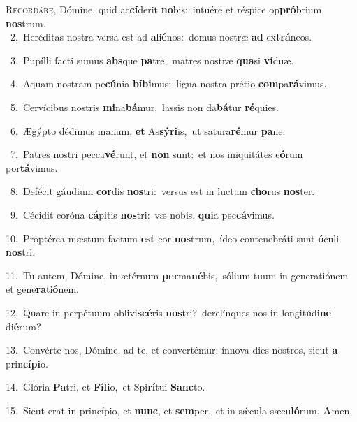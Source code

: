 \lettrine{\initial\textcolor{\initialcolor}{R}}{ecordáre,} Dómine, quid ac\-\textbf{cí}\-derit \textbf{no}\-bis:~\star intuére et réspice op\-\textbf{pró}\-brium \textbf{nos}\-trum.\\
{\numbfont\textcolor{\numbcolor}{~2.}}~Heréditas nostra versa est ad \textbf{a}\-li\-\textbf{é}\-nos:~\star domus nostræ \textbf{ad} ex\-\textbf{trá}\-neos.\par
{\numbfont\textcolor{\numbcolor}{~3.}}~Pupílli facti sumus \textbf{abs}\-que \textbf{pa}\-tre,~\star matres nostræ \textbf{qua}\-si \textbf{ví}\-duæ.\par
{\numbfont\textcolor{\numbcolor}{~4.}}~Aquam nostram pe\-\textbf{cú}\-nia \textbf{bí}\-\textbf{bi}mus:~\star ligna nostra prétio \textbf{com}\-pa\-\textbf{rá}\-vimus.\par
{\numbfont\textcolor{\numbcolor}{~5.}}~Cervícibus nostris \textbf{mi}\-na\-\textbf{bá}\-mur,~\star lassis non da\-\textbf{bá}\-tur \textbf{ré}\-quies.\par
{\numbfont\textcolor{\numbcolor}{~6.}}~Ægýpto dédimus manum, \textbf{et} As\-\textbf{sý}\-\textbf{ri}is,~\star ut satura\-\textbf{ré}\-mur \textbf{pa}\-ne.\par
{\numbfont\textcolor{\numbcolor}{~7.}}~Patres nostri pecca\-\textbf{vé}\-runt, et \textbf{non} sunt:~\star et nos iniquitátes e\-\textbf{ó}\-rum por\-\textbf{tá}\-vimus.\par
{\numbfont\textcolor{\numbcolor}{~8.}}~Defécit gáudium \textbf{cor}\-dis \textbf{nos}\-tri:~\star versus est in luctum \textbf{cho}\-rus \textbf{nos}\-ter.\par
{\numbfont\textcolor{\numbcolor}{~9.}}~Cécidit coróna \textbf{cá}\-pitis \textbf{nos}\-tri:~\star væ nobis, \textbf{qui}\-a pec\-\textbf{cá}\-vimus.\par
{\numbfont\textcolor{\numbcolor}{10.}}~Proptérea mæstum factum \textbf{est} cor \textbf{nos}\-trum,~\star ídeo contenebráti sunt \textbf{ó}\-culi \textbf{nos}\-tri.\par
{\numbfont\textcolor{\numbcolor}{11.}}~Tu autem, Dómine, in ætérnum \textbf{per}\-ma\-\textbf{né}\-bis,~\star sólium tuum in generatiónem et gene\-\textbf{ra}\-ti\-\textbf{ó}\-nem.\par
{\numbfont\textcolor{\numbcolor}{12.}}~Quare in perpétuum oblivi\-\textbf{scé}\-ris \textbf{nos}\-tri?~\star derelínques nos in longitúdi\textbf{ne} di\-\textbf{é}\-rum?\par
{\numbfont\textcolor{\numbcolor}{13.}}~Convérte nos, Dómine, ad te, et convertémur: ínnova dies nostros, sicut \textbf{a} prin\-\textbf{cí}\-\textbf{pi}o.\par
{\numbfont\textcolor{\numbcolor}{14.}}~Glória \textbf{Pa}\-tri, et \textbf{Fí}\-\textbf{li}o,~\star et Spi\-\textbf{rí}\-tui \textbf{Sanc}\-to.\par
{\numbfont\textcolor{\numbcolor}{15.}}~Sicut erat in princípio, et \textbf{nunc}\-, et \textbf{sem}\-per,~\star et in sǽcula sæcu\-\textbf{ló}\-rum. \textbf{A}\-men.\par
